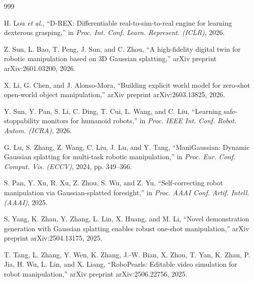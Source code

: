 \documentclass[11pt,a4paper]{article}
\begin{document}
\begin{thebibliography}{999}

H. Lou \textit{et al.}, ``D-REX: Differentiable real-to-sim-to-real engine for learning dexterous grasping,'' in \textit{Proc. Int. Conf. Learn. Represent. (ICLR)}, 2026.




Z. Sun, L. Bao, T. Peng, J. Sun, and C. Zhou, ``A high-fidelity digital twin for robotic manipulation based on {3D} Gaussian splatting,'' arXiv preprint arXiv:2601.03200, 2026.




X. Li, G. Chen, and J. Alonso-Mora, ``Building explicit world model for zero-shot open-world object manipulation,'' arXiv preprint arXiv:2603.13825, 2026.




Y. Sun, Y. Pan, S. Li, C. Ding, T. Cui, L. Wang, and C. Liu, ``Learning safe-stoppability monitors for humanoid robots,'' in \textit{Proc. IEEE Int. Conf. Robot. Autom. (ICRA)}, 2026.




G. Lu, S. Zhang, Z. Wang, C. Liu, J. Lu, and Y. Tang, ``{ManiGaussian}: Dynamic Gaussian splatting for multi-task robotic manipulation,'' in \textit{Proc. Eur. Conf. Comput. Vis. (ECCV)}, 2024, pp. 349--366.




S. Pan, Y. Xu, R. Xu, Z. Zhou, S. Wu, and Z. Yu, ``Self-correcting robot manipulation via Gaussian-splatted foresight,'' in \textit{Proc. AAAI Conf. Artif. Intell. (AAAI)}, 2025.




S. Yang, K. Zhan, Y. Zhang, L. Lin, X. Huang, and M. Li, ``Novel demonstration generation with Gaussian splatting enables robust one-shot manipulation,'' arXiv preprint arXiv:2504.13175, 2025.




T. Tang, L. Zhang, Y. Wen, K. Zhang, J.-W. Bian, X. Zhou, T. Yan, K. Zhan, P. Jia, H. Wu, L. Lin, and X. Liang, ``{RoboPearls}: Editable video simulation for robot manipulation,'' arXiv preprint arXiv:2506.22756, 2025.




\end{thebibliography}
\end{document}
